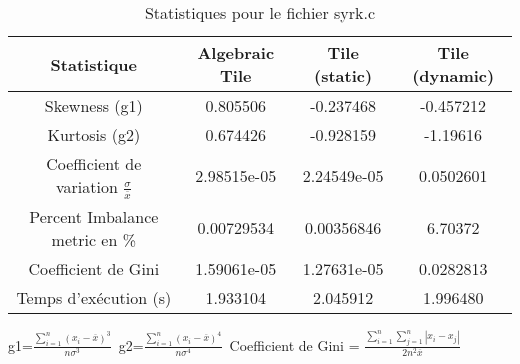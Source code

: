 \documentclass{article}
\begin{document}
\begin{table}[htbp]
  \centering
  \caption{Statistiques pour le fichier syrk.c}
  \begin{tabular}{|c|c|c|c|}
    \hline
    Statistique & Algebraic Tile & Tile (static) & Tile (dynamic) \\ 
    \hline
    Skewness (g1)  & 0.805506 & -0.237468 & -0.457212 \\ 
    Kurtosis (g2)  & 0.674426 & -0.928159 & -1.19616 \\ 
    Coefficient de variation $ \frac{\sigma}{\overline{x}} $ & 2.98515e-05 & 2.24549e-05 & 0.0502601\\ 
    Percent Imbalance metric en \% & 0.00729534 & 0.00356846 & 6.70372\\ 
    Coefficient de Gini  & 1.59061e-05 & 1.27631e-05 & 0.0282813\\ 
    Temps d'exécution (s) &  1.933104    &  2.045912   &  1.996480   \\ 

    \hline
  \end{tabular}
\end{table}\newline
g1=$ \frac{\sum_{i=1}^{n} (x_i - \overline{x})^3}{n\sigma^3} $\
g2=$ \frac{\sum_{i=1}^{n} (x_i - \overline{x})^4}{n\sigma^4} $\
Coefficient de Gini = $ \frac{\sum_{i=1}^{n}\sum_{j=1}^{n} |x_i - x_j|}{2n^2\overline{x}} $\
\newpage
\end{document}
